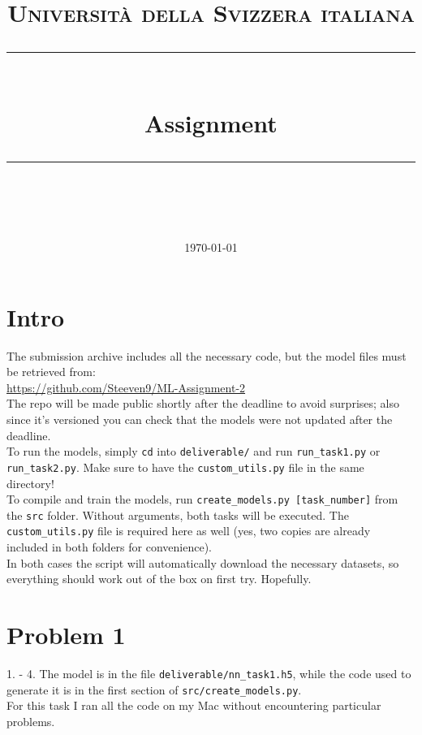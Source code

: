 \documentclass[11pt]{scrartcl}
\title{	
	\normalfont\normalsize
	\textsc{\thecourse\\%
	Università della Svizzera italiana}\\
	\vspace{25pt}
	\rule{\linewidth}{0.5pt}\\
	\vspace{20pt}
	{\huge Assignment \theassnumber}\\
	\vspace{12pt}
	\rule{\linewidth}{0.5pt}\\
	\vspace{12pt}
}
\author{\LARGE \thestudent}
\date{\normalsize\today}
\begin{document}
\maketitle


\section*{Intro}

	The submission archive includes all the necessary code, but the model files must be retrieved from:\\

	\url{https://github.com/Steeven9/ML-Assignment-2}\\

	The repo will be made public shortly after the deadline to avoid surprises; also since it's versioned you can check that the models were not updated after the deadline.\\

	To run the models, simply \texttt{cd} into \texttt{deliverable/} and run \texttt{run\_task1.py} or \texttt{run\_task2.py}. Make sure to have the \texttt{custom\_utils.py} file in the same directory!\\

	To compile and train the models, run \texttt{create\_models.py [task\_number]} from the \texttt{src} folder. Without arguments, both tasks will be executed. The \texttt{custom\_utils.py} file is required here as well (yes, two copies are already included in both folders for convenience).\\

	In both cases the script will automatically download the necessary datasets, so everything should work out of the box on first try. Hopefully.


\newpage
\section*{Problem 1}

	1. - 4. The model is in the file \texttt{deliverable/nn\_task1.h5}, while the code used to 
	generate it is in the first section of \texttt{src/create\_models.py}.\\
	For this task I ran all the code on my Mac without encountering particular problems.\\
	
\end{document}
